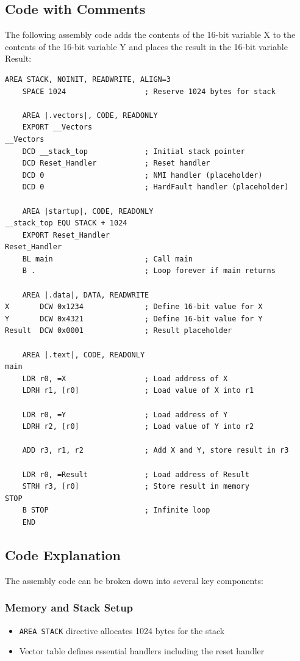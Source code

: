 \documentclass[12pt,a4paper]{article}
\begin{document}
\subsection{Code with Comments}
The following assembly code adds the contents of the 16-bit variable X to the contents of the 16-bit variable Y and places the result in the 16-bit variable Result:

\begin{lstlisting}[language={}]
    AREA STACK, NOINIT, READWRITE, ALIGN=3
    SPACE 1024                  ; Reserve 1024 bytes for stack
    
    AREA |.vectors|, CODE, READONLY
    EXPORT __Vectors
__Vectors
    DCD __stack_top             ; Initial stack pointer
    DCD Reset_Handler           ; Reset handler
    DCD 0                       ; NMI handler (placeholder)
    DCD 0                       ; HardFault handler (placeholder)
    
    AREA |startup|, CODE, READONLY
__stack_top EQU STACK + 1024
    EXPORT Reset_Handler
Reset_Handler
    BL main                     ; Call main
    B .                         ; Loop forever if main returns
    
    AREA |.data|, DATA, READWRITE
X       DCW 0x1234              ; Define 16-bit value for X
Y       DCW 0x4321              ; Define 16-bit value for Y
Result  DCW 0x0001              ; Result placeholder
    
    AREA |.text|, CODE, READONLY
main
    LDR r0, =X                  ; Load address of X
    LDRH r1, [r0]               ; Load value of X into r1
    
    LDR r0, =Y                  ; Load address of Y
    LDRH r2, [r0]               ; Load value of Y into r2
    
    ADD r3, r1, r2              ; Add X and Y, store result in r3
    
    LDR r0, =Result             ; Load address of Result
    STRH r3, [r0]               ; Store result in memory
STOP
    B STOP                      ; Infinite loop
    END
\end{lstlisting}

\subsection{Code Explanation}
The assembly code can be broken down into several key components:

\subsubsection{Memory and Stack Setup}
\begin{itemize}
    \item \texttt{AREA STACK} directive allocates 1024 bytes for the stack
    \item Vector table defines essential handlers including the reset handler
\end{itemize}
\end{document}
